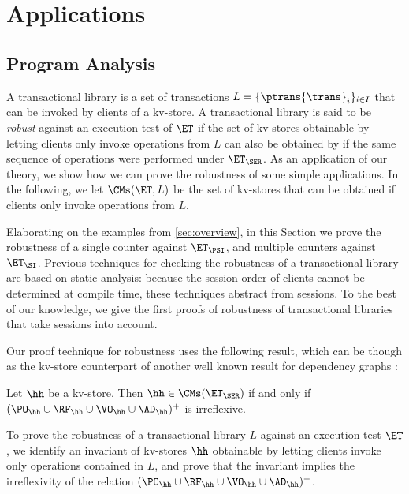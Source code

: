 \section{Applications}
\label{sec:applications}

\subsection{Program Analysis}
\label{sec:program-analysis}
A transactional library is a set of transactions 
$L = \{\ptrans{\trans}_{i}\}_{i \in I}$ that can be invoked 
by clients of a kv-store. A transactional library is said to be 
\emph{robust} against an execution test of $\ET$ if the set of kv-stores 
obtainable by letting clients only invoke operations from $L$ can also be obtained by 
if the same sequence of operations were performed under $\ET_{\SER}$.
As an application of our theory, we show how we 
can prove the robustness of some simple applications. 
In the following, we let $\CMs(\ET, L)$ be 
the set of kv-stores that can be obtained if clients 
only invoke operations from $L$.

Elaborating on the examples from \cref{sec:overview}, in this Section 
we prove the robustness of a single counter against $\ET_{\PSI}$, 
and multiple counters against $\ET_{\SI}$. Previous techniques for 
checking the robustness of a transactional library \cite{giovanni_concur16,SIanalysis,laws,sureshConcur} 
are based on static analysis: because the session order of clients cannot be determined at compile 
time, these techniques abstract from sessions. To the best of our knowledge, 
we give the first proofs of robustness of transactional libraries that take sessions into 
account.

Our proof technique for robustness uses the following result, which can be though 
as the kv-store counterpart of another well known result for dependency graphs \cite{adya}:
\begin{theorem}
\label{thm:serialisable_nocycle}
Let $\hh$ be a kv-store. Then $\hh \in \CMs(\ET_{\SER})$ if and only if $(\PO_{\hh} \cup \RF_{\hh} 
\cup \VO_{\hh} \cup \AD_{\hh})^{+}$ is irreflexive.
\end{theorem}
To prove the robustness of a transactional library $L$ against an execution test 
$\ET$, we identify an invariant of kv-stores $\hh$ obtainable by letting clients 
invoke only operations contained in $L$, and prove that the invariant 
implies the irreflexivity of the relation $(\PO_{\hh} \cup \RF_{\hh} \cup \VO_{\hh} \cup 
\AD_{\hh})^{+}$.


